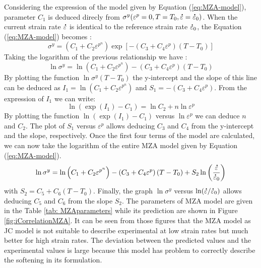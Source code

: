 \documentclass[twoside,english,1p,final,sort&compress]{elsarticle}
\theoremstyle{plain}
\newcommand{\mdot}[1]{\accentset{\mbox{\bfseries .}}{#1}}
\begin{document}
Considering the expression of the model given by Equation (\ref{eq:MZA-model}), parameter $C_1$ is deduced direcly from $\sigma^y(\varepsilon^p=0,T=T_0,\mdot\varepsilon=\mdot{\varepsilon}_0)$.
When the current strain rate $\mdot\varepsilon$ is identical to the reference strain rate $\mdot{\varepsilon}_0$, the Equation (\ref{eq:MZA-model}) becomes :
\begin{equation}
\sigma^y = \left(C_{1}+C_{2}\varepsilon^{p^n}\right) \exp\left[-\left(C_{3}+C_{4}\varepsilon^p\right)\left(T-T_0\right)\right]
\end{equation}
Taking the logarithm of the previous relationship we have :
\begin{equation}
\ln\sigma^y = \ln\left(C_{1}+C_{2}\varepsilon^{p^n}\right)-\left(C_{3}+C_{4}\varepsilon^p\right)\left(T-T_0\right)
\end{equation}
By plotting the function $\ln\sigma^y\left(T-T_0\right)$ the y-intercept and the slope of this line can be deduced as $I_1=\ln\left(C_1+C_2\varepsilon^{p^n}\right)$ and $S_1=-\left(C_3+C_4\varepsilon^p\right)$.
From the expression of $I_1$ we can write:
\begin{equation}
\ln\left(\exp(I_1)-C_1\right) = \ln C_2+n\ln\varepsilon^p
\end{equation}
By plotting the function $\ln\left(\exp(I_1)-C_1\right)$ versus $\ln\varepsilon^p$ we can deduce $n$ and $C_2$.
The plot of $S_1$ versus $\varepsilon^p$ allows deducing $C_3$ and $C_4$ from the y-intercept and the slope, respectively.
Once the first four terms of the model are calculated, we can now take the logarithm of the entire MZA model given by Equation (\ref{eq:MZA-model}).
\begin{equation}
\ln\sigma^y = \ln\left(C_{1}+C_{2}\varepsilon^{p^n}\right) - \left(C_{3}+C_{4}\varepsilon^p\right)\left(T-T_0\right) + S_2\ln\left( \frac{\mdot\varepsilon}{\mdot{\varepsilon}_0}\right)
\end{equation}
with $S_2=C_5+C_6\left(T-T_0\right)$.
Finally, the graph $\ln\sigma^y$ versus $ \ln(\mdot\varepsilon/\mdot{\varepsilon}_0)$ allows deducing $C_5$ and $C_6$ from the slope $S_2$.
The parameters of MZA model are given in the Table \ref{tab: MZAparameters} while its prediction are shown in Figure \ref{fig:iCorrelationMZA}.
It can be seen from those figures that the MZA model as JC model is not suitable to describe experimental at low strain rates but much better for high strain rates.
The deviation between the predicted values and the experimental values is large because this model has problem to correctly describe the softening in its formulation.
\end{document}
